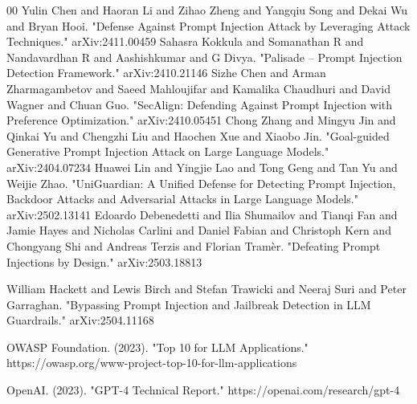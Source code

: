 \documentclass[conference]{IEEEtran}
\begin{document}
\begin{thebibliography}{00}
 Yulin Chen and Haoran Li and Zihao Zheng and Yangqiu Song and Dekai Wu and Bryan Hooi. "Defense Against Prompt Injection Attack by Leveraging Attack Techniques." arXiv:2411.00459
 Sahasra Kokkula and Somanathan R and Nandavardhan R and Aashishkumar and G Divya. "Palisade -- Prompt Injection Detection Framework." 	arXiv:2410.21146
 Sizhe Chen and Arman Zharmagambetov and Saeed Mahloujifar and Kamalika Chaudhuri and David Wagner and Chuan Guo. "SecAlign: Defending Against Prompt Injection with Preference Optimization." arXiv:2410.05451
 Chong Zhang and Mingyu Jin and Qinkai Yu and Chengzhi Liu and Haochen Xue and Xiaobo Jin. "Goal-guided Generative Prompt Injection Attack on Large Language Models."	arXiv:2404.07234
 Huawei Lin and Yingjie Lao and Tong Geng and Tan Yu and Weijie Zhao. "UniGuardian: A Unified Defense for Detecting Prompt Injection, Backdoor Attacks and Adversarial Attacks in Large Language Models." 	arXiv:2502.13141
 Edoardo Debenedetti and Ilia Shumailov and Tianqi Fan and Jamie Hayes and Nicholas Carlini and Daniel Fabian and Christoph Kern and Chongyang Shi and Andreas Terzis and Florian Tramèr. "Defeating Prompt Injections by Design."	arXiv:2503.18813

 William Hackett and Lewis Birch and Stefan Trawicki and Neeraj Suri and Peter Garraghan. "Bypassing Prompt Injection and Jailbreak Detection in LLM Guardrails."	arXiv:2504.11168

 OWASP Foundation. (2023). "Top 10 for LLM Applications." https://owasp.org/www-project-top-10-for-llm-applications

 OpenAI. (2023). "GPT-4 Technical Report." https://openai.com/research/gpt-4 


\end{thebibliography}
\end{document}
